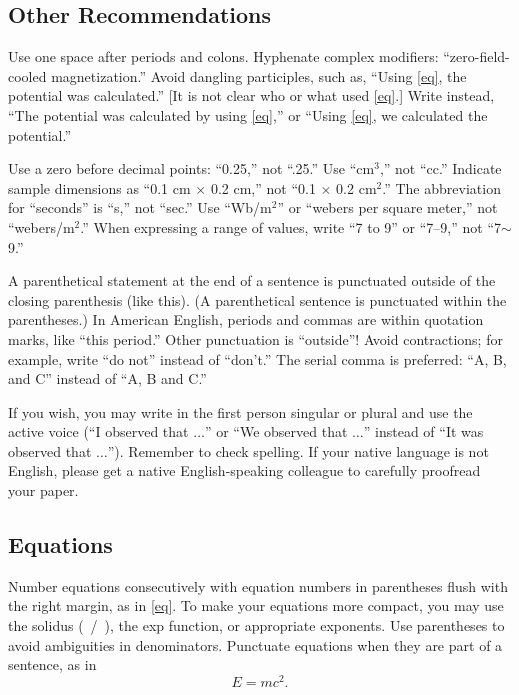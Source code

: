 \documentclass[journal,twoside,web]{ieeecolor}
\begin{document}
\subsection{Other Recommendations}
Use one space after periods and colons. Hyphenate complex modifiers: 
``zero-field-cooled magnetization.'' Avoid dangling participles, such as, 
``Using \eqref{eq}, the potential was calculated.'' [It is not clear who or what 
used \eqref{eq}.] Write instead, ``The potential was calculated by using \eqref{eq},'' or 
``Using \eqref{eq}, we calculated the potential.''

Use a zero before decimal points: ``0.25,'' not ``.25.'' Use 
``cm$^{3}$,'' not ``cc.'' Indicate sample dimensions as ``0.1 cm 
$\times $ 0.2 cm,'' not ``0.1 $\times $ 0.2 cm$^{2}$.'' The 
abbreviation for ``seconds'' is ``s,'' not ``sec.'' Use 
``Wb/m$^{2}$'' or ``webers per square meter,'' not 
``webers/m$^{2}$.'' When expressing a range of values, write ``7 to 
9'' or ``7--9,'' not ``7$\sim $9.''

A parenthetical statement at the end of a sentence is punctuated outside of 
the closing parenthesis (like this). (A parenthetical sentence is punctuated 
within the parentheses.) In American English, periods and commas are within 
quotation marks, like ``this period.'' Other punctuation is ``outside''! 
Avoid contractions; for example, write ``do not'' instead of ``don't.'' The 
serial comma is preferred: ``A, B, and C'' instead of ``A, B and C.''

If you wish, you may write in the first person singular or plural and use 
the active voice (``I observed that $\ldots$'' or ``We observed that $\ldots$'' 
instead of ``It was observed that $\ldots$''). Remember to check spelling. If 
your native language is not English, please get a native English-speaking 
colleague to carefully proofread your paper.


\subsection{Equations}
Number equations consecutively with equation numbers in parentheses flush 
with the right margin, as in \eqref{eq}. To make your equations more 
compact, you may use the solidus (~/~), the exp function, or appropriate 
exponents. Use parentheses to avoid ambiguities in denominators. Punctuate 
equations when they are part of a sentence, as in
\begin{equation}E=mc^2.\label{eq}\end{equation}
\end{document}
